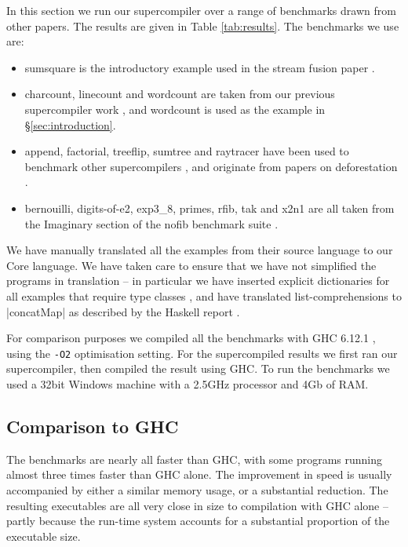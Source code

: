 \documentclass[draft]{sigplanconf}
\begin{document}
In this section we run our supercompiler over a range of benchmarks drawn from other papers. The results are given in Table \ref{tab:results}. The benchmarks we use are:

\begin{itemize}
\item sumsquare is the introductory example used in the stream fusion paper \cite{coutts:stream_fusion}.
\item charcount, linecount and wordcount are taken from our previous supercompiler work \cite{me:supero}, and wordcount is used as the example in \S\ref{sec:introduction}.
\item append, factorial, treeflip, sumtree and raytracer have been used to benchmark other supercompilers \cite{jonsson:supercompilation}, and originate from papers on deforestation \cite{wadler:deforestation,kort:raytracer}.
\item bernouilli, digits-of-e2, exp3\_8, primes, rfib, tak and x2n1 are all taken from the Imaginary section of the nofib benchmark suite \cite{nofib}.
\end{itemize}

We have manually translated all the examples from their source language to our Core language. We have taken care to ensure that we have not simplified the programs in translation -- in particular we have inserted explicit dictionaries for all examples that require type classes \cite{wadler:type_classes}, and have translated list-comprehensions to |concatMap| as described by the Haskell report \cite{haskell}.

For comparison purposes we compiled all the benchmarks with GHC 6.12.1 \cite{ghc6_12}, using the \texttt{-O2} optimisation setting. For the supercompiled results we first ran our supercompiler, then compiled the result using GHC. To run the benchmarks we used a 32bit Windows machine with a 2.5GHz processor and 4Gb of RAM.

\subsection{Comparison to GHC}

The benchmarks are nearly all faster than GHC, with some programs running almost three times faster than GHC alone. The improvement in speed is usually accompanied by either a similar memory usage, or a substantial reduction. The resulting executables are all very close in size to compilation with GHC alone -- partly because the run-time system accounts for a substantial proportion of the executable size.
\end{document}
